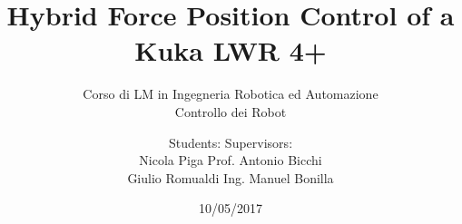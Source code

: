 \documentclass{beamer}
\date{10/05/2017}
\title[]{Hybrid Force Position Control of a Kuka LWR 4+}
\subtitle{Corso di LM in Ingegneria Robotica ed Automazione \\
  Controllo dei Robot}
\author{Students:\hskip3in Supervisors:\\
Nicola Piga \hskip2.3in Prof. Antonio Bicchi\\
Giulio Romualdi \hskip2.1in Ing. Manuel Bonilla}
\institute[]{Università di Pisa}
\begin{document}

\begin{frame}
  \maketitle
\end{frame}








\end{document}
